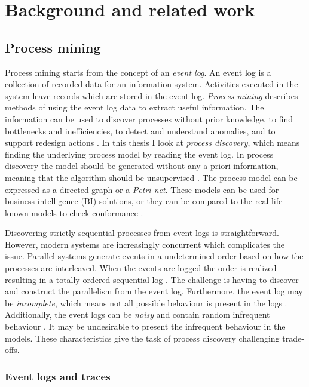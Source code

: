 \documentclass[english,12pt,a4paper,pdftex,sci,utf8]{aaltothesis}
\theoremstyle{definition}
\begin{document}
\clearpage
\section{Background and related work}
\label{sec:background}

\subsection{Process mining}

Process mining starts from the concept of an \emph{event log}.
An event log is a collection of recorded data for an information system.
Activities executed in the system leave records which are stored in the event log.
\emph{Process mining} describes methods of using the event log data to extract useful information.
The information can be used to discover processes without prior knowledge, to find bottlenecks and inefficiencies, to detect and understand anomalies, and to support redesign actions \cite{van2015extracting}.
In this thesis I look at \emph{process discovery}, which means finding the underlying process model
by reading the event log.
In process discovery the model should be generated without any a-priori information, meaning that the algorithm should be unsupervised \cite{van2013discovering}.
The process model can be expressed as a directed graph or a \emph{Petri net}.
These models can be used for business intelligence (BI) solutions, or they can be compared to the real life
known models to check conformance \cite{van2013discovering}.


Discovering strictly sequential processes from event logs is straightforward. However, modern systems are increasingly concurrent which complicates the issue. 
Parallel systems generate events in a undetermined order based on how the processes are interleaved. 
When the events are logged the order is realized resulting in a totally ordered sequential log \cite{van2004workflow}. 
The challenge is having to discover and construct the parallelism from the event log.
Furthermore, the event log may be \emph{incomplete}, which means not all possible behaviour is present in the logs \cite{van2013discovering}.
Additionally, the event logs can be \emph{noisy} and contain random infrequent behaviour \cite{van2013discovering}.
It may be undesirable to present the infrequent behaviour in the models.
These characteristics give the task of process discovery challenging trade-offs.

\subsubsection{Event logs and traces}
\end{document}
